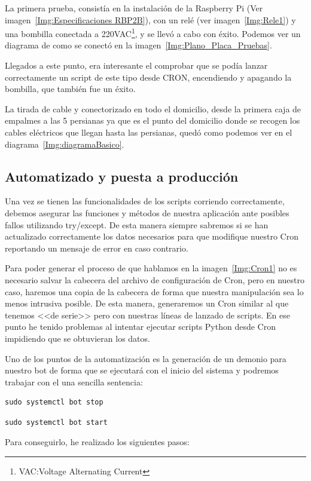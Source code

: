 La primera prueba, consistía en la instalación de la Raspberry Pi (Ver imagen~\ref{Img:Especificaciones RBP2B}), con un relé (ver imagen~\ref{Img:Rele1}) y una bombilla conectada a 220VAC\footnote{VAC:Voltage Alternating Current}, y se llevó a cabo con éxito. Podemos ver un diagrama de como se conectó en la imagen~\ref{Img:Plano_Placa_Pruebas}.

Llegados a este punto, era interesante el comprobar que se podía lanzar correctamente un script de este tipo desde CRON, encendiendo y apagando la bombilla, que también fue un éxito.

La tirada de cable y conectorizado en todo el domicilio, desde la primera caja de empalmes a las 5 persianas ya que es el punto del domicilio donde se recogen los cables eléctricos que llegan hasta las persianas, quedó como podemos ver en el diagrama~\ref{Img:diagramaBasico}. 

\subsection{Automatizado y puesta a producción}
Una vez se tienen las funcionalidades de los scripts corriendo correctamente, debemos asegurar las funciones y métodos de nuestra aplicación ante posibles fallos utilizando try/except. De esta manera siempre sabremos si se han actualizado correctamente los datos necesarios para que modifique nuestro Cron reportando un mensaje de error en caso contrario.

Para poder generar el proceso de que hablamos en la imagen~\ref{Img:Cron1} no es necesario salvar la cabecera del archivo de configuración de Cron, pero en nuestro caso, haremos una copia de la cabecera de forma que nuestra manipulación sea lo menos intrusiva posible. De esta manera, generaremos un Cron similar al que tenemos <<de serie>> pero con nuestras líneas de lanzado de scripts.
En ese punto he tenido problemas al intentar ejecutar scripts Python desde Cron impidiendo que se obtuvieran los datos.

Uno de los puntos de la automatización es la generación de un demonio para nuestro bot de forma que se ejecutará con el inicio del sistema y podremos trabajar con el una sencilla sentencia:

\begin{lstlisting}[language=cpp,firstnumber=0]
sudo systemctl bot stop
\end{lstlisting}
\begin{lstlisting}[language=cpp]
sudo systemctl bot start 
\end{lstlisting}
Para conseguirlo, he realizado los siguientes pasos:

